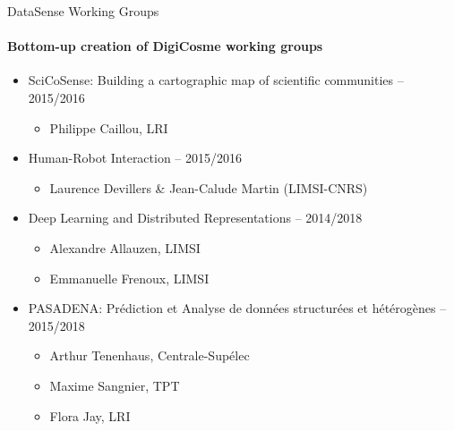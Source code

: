 \begin{frame}{DataSense Working Groups}
  \framesubtitle{Bottom-up creation of DigiCosme working groups}

      \begin{itemize}    
      \item SciCoSense: Building a cartographic map of scientific communities -- 2015/2016
        \begin{itemize}
        \item Philippe Caillou, LRI
        \end{itemize}

      \item Human-Robot Interaction -- 2015/2016
        \begin{itemize}
        \item Laurence Devillers \& Jean-Calude Martin (LIMSI-CNRS) 
        \end{itemize}

      \item Deep Learning and Distributed Representations -- 2014/2018
        \begin{itemize}
        \item Alexandre Allauzen, LIMSI 
        \item Emmanuelle Frenoux, LIMSI 
        \end{itemize}

      \item PASADENA: Prédiction et Analyse de données structurées et hétérogènes -- 2015/2018
        \begin{itemize}
          \item Arthur Tenenhaus, Centrale-Supélec
          \item Maxime Sangnier, TPT 
          \item Flora Jay, LRI
        \end{itemize}

      \end{itemize}
\end{frame}

